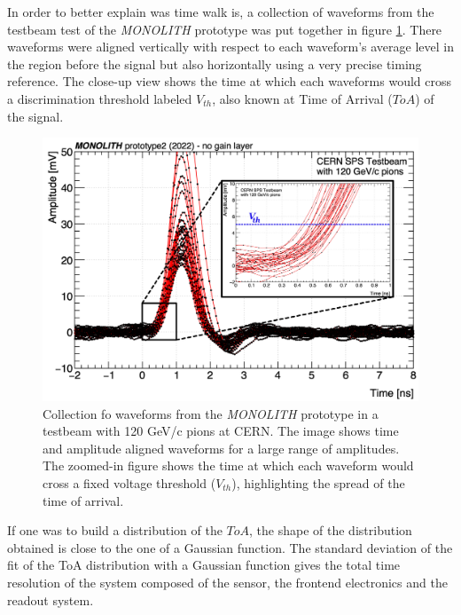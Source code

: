 	In order to better explain was time walk is, a collection of waveforms from the testbeam test of the \textit{MONOLITH} prototype was put together in figure \ref{im:waveforms_timeresolution}. There waveforms were aligned vertically with respect to each waveform's average level in the region before the signal but also horizontally using a very precise timing reference. The close-up view shows the time at which each waveforms would cross a discrimination threshold labeled $V_{th}$, also known at Time of Arrival ($ToA$) of the signal.
	\begin{figure}[h]
		\centering
		\includegraphics[width=0.85\linewidth]{files/waveforms_timeresolution}
		\caption{Collection fo waveforms from the \textit{MONOLITH} prototype in a testbeam with 120 GeV/c pions at CERN. The image shows time and amplitude aligned waveforms for a large range of amplitudes. The zoomed-in figure shows the time at which each waveform would cross a fixed voltage threshold ($V_{th}$), highlighting the spread of the time of arrival.}
		\label{im:waveforms_timeresolution}
	\end{figure} 
	
	If one was to build a distribution of the $ToA$, the shape of the distribution obtained is close to the one of a Gaussian function. The standard deviation of the fit of the ToA distribution with a Gaussian function gives the total time resolution of the system composed of the sensor, the frontend electronics and the readout system. 
	

